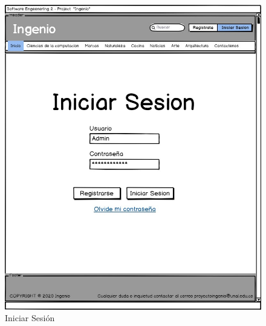 \documentclass[a4paper,12 pt]{article}
\begin{document}
\begin{figure}[H]
    \centering
    \includegraphics[scale = 0.7]{images/IniciarSesion.jpg}
    \caption{Iniciar Sesión}
    \label{F101}
\end{figure}{}
\end{document}
